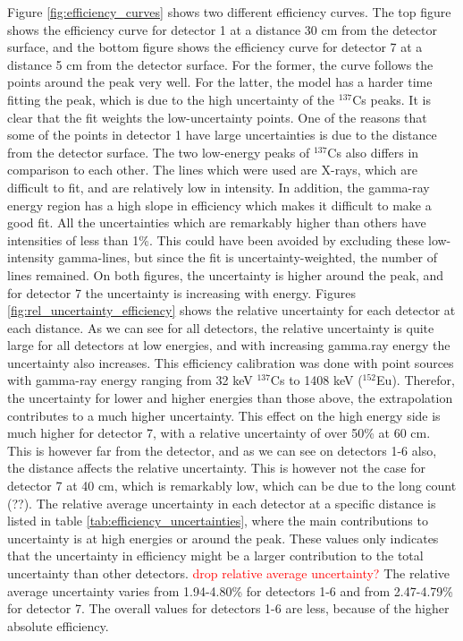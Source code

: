 Figure \ref{fig:efficiency_curves} shows two different efficiency curves. The top figure shows the efficiency curve for detector 1 at a distance 30 cm from the detector surface, and the bottom figure shows the efficiency curve for detector 7 at a distance 5 cm from the detector surface. For the former, the curve follows the points around the peak very well. For the latter, the model has a harder time fitting the peak, which is due to the high uncertainty of the $^{137}$Cs peaks. It is clear that the fit weights the low-uncertainty points. One of the reasons that some of the points in detector 1 have large uncertainties is due to the distance from the detector surface.  The two low-energy peaks of $^{137}$Cs also differs in comparison to each other. The lines which were used are X-rays, which are difficult to fit, and are relatively low in intensity. In addition, the gamma-ray energy region has a high slope in efficiency which makes it difficult to make a good fit.  All the uncertainties which are remarkably higher than others have intensities of less than 1\%. This could have been avoided by excluding these low-intensity gamma-lines, but since the fit is uncertainty-weighted, the number of lines remained. On both figures, the uncertainty is higher around the peak, and for detector 7 the uncertainty is increasing with energy. Figures \ref{fig:rel_uncertainty_efficiency} shows the relative uncertainty for each detector at each distance. As we can see for all detectors, the relative uncertainty is quite large for all detectors at low energies, and with increasing gamma.ray energy the uncertainty also increases. This efficiency calibration was done with point sources with gamma-ray energy ranging from 32 keV $^{137}$Cs to 1408 keV ($^{152}$Eu). Therefor, the uncertainty for lower and higher energies than those above, the extrapolation contributes to a much higher uncertainty. This effect on the high energy side is much higher for detector 7, with a relative uncertainty of over 50\% at 60 cm. This is however far from the detector, and as we can see on detectors 1-6 also, the distance affects the relative uncertainty. This is however not the case for detector 7 at 40 cm, which is remarkably low, which can be due to the long count (??). The relative average uncertainty in each detector at a specific distance is listed in table \ref{tab:efficiency_uncertainties}, where the main contributions to uncertainty is at high energies or around the peak. These values only indicates that the uncertainty in efficiency might be a larger contribution to the total uncertainty than other detectors. \textcolor{red}{drop relative average uncertainty?}  The relative average uncertainty varies from 1.94-4.80\% for detectors 1-6 and from 2.47-4.79\% for detector 7. The overall values for detectors 1-6 are less, because of the higher absolute efficiency. \\


